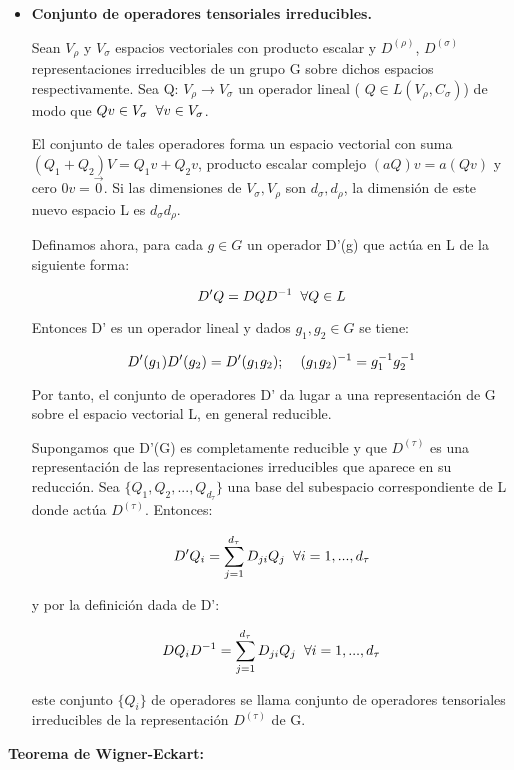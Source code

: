 \documentclass{article}
\begin{document}
\begin{itemize}
\item \textbf{Conjunto de operadores tensoriales irreducibles.}

Sean $V_\rho$ y $V_\sigma$ espacios vectoriales con producto escalar y $D^{(\rho)}$, $D^{(\sigma)}$ representaciones irreducibles de un grupo G sobre dichos espacios respectivamente. Sea Q: $V_\rho \to V_\sigma$ un operador lineal ( $Q \in L(V_\rho ,C_\sigma)$) de modo que  $Qv\in V_\sigma \hspace{0.2cm} \forall v\in V_\sigma$.

El conjunto de tales operadores forma un espacio vectorial con suma $(Q_1+Q_2)V=Q_1v+Q_2v$, producto escalar complejo $(aQ)v=a(Qv)$ y cero $0v=\Vec{0}$. Si las dimensiones de $V_\sigma, V_\rho$ son $d_\sigma, d_ \rho$, la dimensión de este nuevo espacio L es $d_ \sigma d_\rho$.

Definamos ahora, para cada $g\in G$ un operador D'(g) que actúa en L de la siguiente forma:

$$D'Q=DQD^{-1} \hspace{0.2cm}\forall Q\in L$$

Entonces D' es un operador lineal y dados $g_1, g_2 \in G$ se tiene:

$$D'(g_1)D'(g_2)=D'(g_1g_2); \hspace{0.4cm} (g_1g_2)^{-1}=g_1^{-1}g_2^{-1}$$

Por tanto, el conjunto de operadores D' da lugar a una representación de G sobre el espacio vectorial L, en general reducible.

Supongamos que D'(G) es completamente reducible y que $D^{(\tau)}$ es una representación de las representaciones irreducibles que aparece en su reducción. Sea $\lbrace Q_1,Q_2,...,Q_{d_\tau}\rbrace$ una base del subespacio correspondiente de L donde actúa $D^{(\tau)}$. Entonces:

$$D'Q_i=\sum _{j=1}^{d_\tau} D_{ji}Q_j \hspace{0.2cm} \forall i=1,..., d_\tau$$

y por la definición dada de D':

$$DQ_iD^{-1}=\sum _{j=1}^{d_\tau} D_{ji}Q_j \hspace{0.2cm} \forall i=1,..., d_\tau$$

este conjunto $\lbrace Q_i\rbrace$ de operadores se llama conjunto de operadores tensoriales irreducibles de la representación $D^{(\tau)}$ de G.
\end{itemize}

\smallskip
\textbf{Teorema de Wigner-Eckart:}
\end{document}
